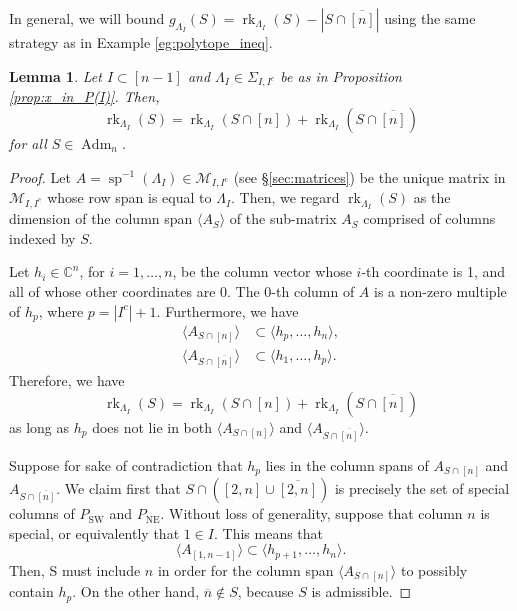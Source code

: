 \documentclass[12pt]{amsart}
\newtheorem{lemma}[definition]{Lemma}
\DeclareMathOperator{\Adm}{Adm}
\DeclareMathOperator{\NE}{NE}
\DeclareMathOperator{\ssp}{sp}
\DeclareMathOperator{\SW}{SW}
\DeclareMathOperator{\rk}{rk}
\newcommand{\bC}{\mathbb{C}}
\newcommand{\cM}{\mathcal{M}}
\newcommand{\barn}{\overline{n}}
\begin{document}
In general, we will bound $g_{\Lambda_I}(S)=\rk_{\Lambda_I}(S) - |S \cap \overline{[n]}|$ using the same strategy as in Example \ref{eg:polytope_ineq}.

\begin{lemma}\label{lem:split_rank}
    Let $I \subset [n-1]$ and $\Lambda_I \in \Sigma_{I,I^c}$ be as in Proposition \ref{prop:x_in_P(I)}. Then,
    \begin{equation*}
        \rk_{\Lambda_I}(S) = \rk_{\Lambda_I}(S \cap [n])+ \rk_{\Lambda_I}(S \cap \overline{[n]})
    \end{equation*}
    for all $S \in \Adm_n$.
\end{lemma}

\begin{proof}
Let $A=\ssp^{-1}(\Lambda_I)\in\cM_{I,I^c}$ (see \S\ref{sec:matrices}) be the unique matrix in $\cM_{I,I^c}$ whose row span is equal to $\Lambda_I$. Then, we regard $\rk_{\Lambda_I}(S)$ as the dimension of the column span $\langle A_S\rangle$ of the sub-matrix $A_S$ comprised of columns indexed by $S$.

Let $h_i\in\bC^n$, for $i=1,\ldots,n$, be the column vector whose $i$-th coordinate is 1, and all of whose other coordinates are 0. The 0-th column of $A$ is a non-zero multiple of $h_p$, where $p=|I^c|+1$. Furthermore, we have
\begin{align*}
    \langle A_{S\cap[n]} \rangle &\subset \langle h_p,\ldots,h_n\rangle,\\
    \langle A_{S\cap\overline{[n]}} \rangle &\subset \langle h_1,\ldots,h_p\rangle.
\end{align*}
Therefore, we have
    \begin{equation*}
        \rk_{\Lambda_I}(S) = \rk_{\Lambda_I}(S \cap [n])+ \rk_{\Lambda_I}(S \cap \overline{[n]})
    \end{equation*}
as long as $h_p$ does not lie in both $\langle A_{S\cap[n]} \rangle$ and $\langle A_{S\cap\overline{[n]}} \rangle$.

Suppose for sake of contradiction that $h_p$ lies in the column spans of $A_{S\cap[n]}$ and $A_{S\cap\overline{[n]}}$. We claim first that $S\cap([2,n]\cup\overline{[2,n]})$ is precisely the set of special columns of $P_{\SW}$ and $P_{\NE}$. Without loss of generality, suppose that column $n$ is special, or equivalently that $1\in I$. This means that 
\begin{equation*}
    \langle A_{[1,n-1]}\rangle \subset \langle h_{p+1}, \ldots, h_n \rangle.
\end{equation*} 
Then, S must include $n$ in order for the column span $\langle A_{S \cap [n]}\rangle$ to possibly contain $h_{p}$. On the other hand, $\barn \notin S$, because $S$ is admissible. 


\end{proof}
\end{document}
